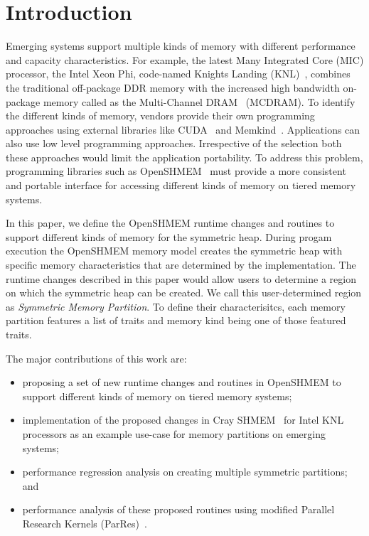 \section{Introduction}
\label{src:intro}

Emerging systems support multiple kinds of memory with different
performance and capacity characteristics. For example, the latest
Many Integrated Core (MIC) processor, the Intel Xeon Phi,
code-named Knights Landing (KNL)~\cite{KNL}, combines the traditional
off-package DDR memory with the increased high bandwidth on-package
memory called as the Multi-Channel DRAM~\cite{MCDRAM} (MCDRAM). %
To identify the different kinds of memory,
vendors provide their own programming approaches
using external libraries like CUDA~\cite{cuda} and
Memkind~\cite{memkind}.
Applications can also use low level programming approaches.
Irrespective of the
selection both these approaches would limit the application
portability.%
To address this problem, programming libraries such as
OpenSHMEM~\cite{osm} must provide a more consistent and portable
interface
for accessing different kinds of memory on tiered memory systems.

In this paper, we define the OpenSHMEM runtime changes and routines
to support different kinds of memory for the symmetric heap. During
progam execution the
OpenSHMEM memory model creates the symmetric heap with specific
memory characteristics that are determined by the implementation.
The runtime changes described in this paper would allow users to
determine
a region on which the symmetric heap can be created. We call this
user-determined region as \emph{Symmetric Memory Partition}. To define
their characterisitcs, each memory partition features a list of traits
and memory kind being one of those featured traits.

The major contributions of this work are:
\begin{itemize}
    \item proposing a set of new runtime changes and routines in
    OpenSHMEM to support different kinds of memory on tiered memory
    systems;
    \item implementation of the proposed changes in
    Cray SHMEM~\cite{csma} for Intel KNL processors as an example
    use-case for memory partitions on emerging systems;
    \item performance regression analysis on creating multiple
    symmetric partitions; and
    \item performance analysis of these proposed routines using
    modified Parallel Research Kernels (ParRes)~\cite{parres}.
\end{itemize}

